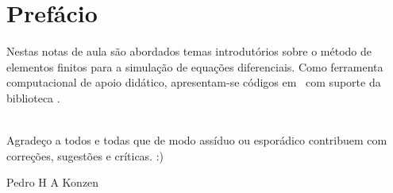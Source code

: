 
\chapter*{Prefácio}\label{prefacio}

Nestas notas de aula são abordados temas introdutórios sobre o método de elementos finitos para a simulação de equações diferenciais. Como ferramenta computacional de apoio didático, apresentam-se códigos em \python\, com suporte da biblioteca \fenicsx.

~\\

Agradeço a todos e todas que de modo assíduo ou esporádico contribuem com correções, sugestões e críticas. :)

\begin{flushright}
  Pedro H A Konzen
\end{flushright}

